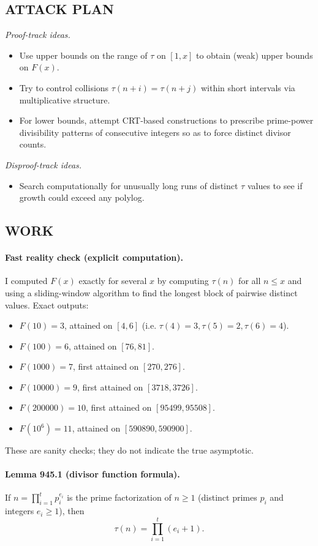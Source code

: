 \subsection*{ATTACK PLAN}
\emph{Proof-track ideas.}
\begin{itemize}
\item Use upper bounds on the range of $\tau$ on $[1,x]$ to obtain (weak) upper bounds on $F(x)$.
\item Try to control collisions $\tau(n+i)=\tau(n+j)$ within short intervals via multiplicative structure.
\item For lower bounds, attempt CRT-based constructions to prescribe prime-power divisibility patterns of consecutive integers so as to force distinct divisor counts.
\end{itemize}
\emph{Disproof-track ideas.}
\begin{itemize}
\item Search computationally for unusually long runs of distinct $\tau$ values to see if growth could exceed any polylog.
\end{itemize}

\subsection*{WORK}
\paragraph{Fast reality check (explicit computation).}
I computed $F(x)$ exactly for several $x$ by computing $\tau(n)$ for all $n\le x$ and using a sliding-window algorithm to find the longest block of pairwise distinct values.
Exact outputs:
\begin{itemize}
\item $F(10)=3$, attained on $[4,6]$ (i.e. $\tau(4)=3,\tau(5)=2,\tau(6)=4$).
\item $F(100)=6$, attained on $[76,81]$.
\item $F(1000)=7$, first attained on $[270,276]$.
\item $F(10000)=9$, first attained on $[3718,3726]$.
\item $F(200000)=10$, first attained on $[95499,95508]$.
\item $F(10^6)=11$, attained on $[590890,590900]$.
\end{itemize}
These are sanity checks; they do not indicate the true asymptotic.

\paragraph{Lemma 945.1 (divisor function formula).}
If $n=\prod_{i=1}^t p_i^{e_i}$ is the prime factorization of $n\ge 1$ (distinct primes $p_i$ and integers $e_i\ge 1$), then
\[
\tau(n)=\prod_{i=1}^t (e_i+1).
\]

